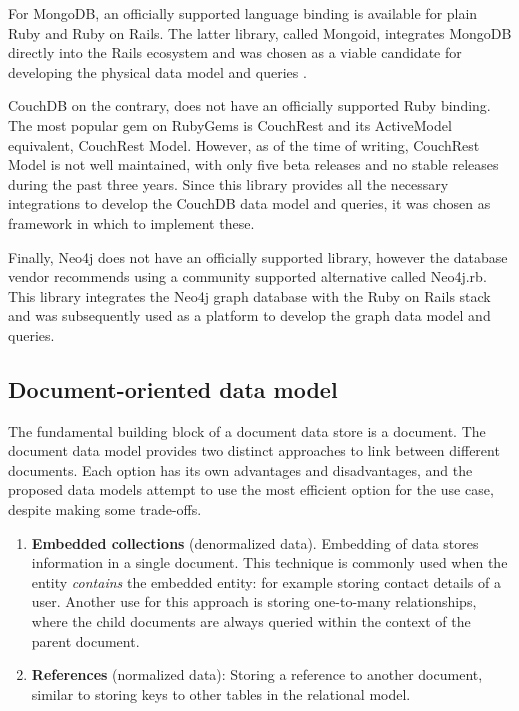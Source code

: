 For MongoDB, an officially supported language binding is available for plain Ruby and Ruby on Rails.
The latter library, called Mongoid, integrates MongoDB directly into the Rails ecosystem and was chosen as a viable candidate for developing the physical data model and queries \autocite{Mongoid2009}.

CouchDB on the contrary, does not have an officially supported Ruby binding.
The most popular gem on RubyGems is CouchRest and its ActiveModel equivalent, CouchRest Model.
However, as of the time of writing, CouchRest Model is not well maintained, with only five beta releases and no stable releases during the past three years.
Since this library provides all the necessary integrations to develop the CouchDB data model and queries, it was chosen as framework in which to implement these.

Finally, Neo4j does not have an officially supported library, however the database vendor recommends using a community supported alternative called Neo4j.rb.
This library integrates the Neo4j graph database with the Ruby on Rails stack and was subsequently used as a platform to develop the graph data model and queries.


\subsection{Document-oriented data model}
\label{subsec:document-data-model}

The fundamental building block of a document data store is a document.
The document data model provides two distinct approaches to link between different documents.
Each option has its own advantages and disadvantages, and the proposed data models attempt to use the most efficient option for the use case, despite making some trade-offs.

\begin{enumerate}
  \item \textbf{Embedded collections} (denormalized data).
        Embedding of data stores information in a single document.
        This technique is commonly used when the entity \textit{contains} the embedded entity: for example storing contact details of a user.
        Another use for this approach is storing one-to-many relationships, where the child documents are always queried within the context of the parent document.
  \item \textbf{References} (normalized data): Storing a reference to another document, similar to storing keys to other tables in the relational model.
\end{enumerate}

